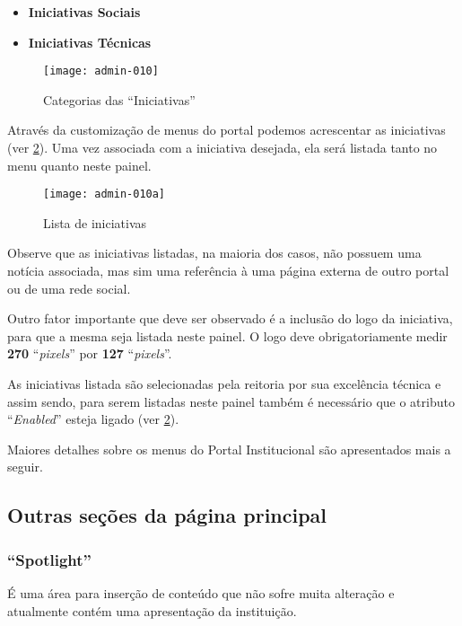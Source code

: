 \begin{itemize}
    \item \textbf{Iniciativas Sociais}
    \item \textbf{Iniciativas Técnicas}
\end{itemize}

\begin{figure}[!ht]
    \centering
    \texttt{[image: admin-010]}
    \caption{Categorias das ``Iniciativas''}\label{RS0006:fig:admin-010}
\end{figure}

Através da customização de menus do portal podemos acrescentar as iniciativas (ver \cref{RS0006:fig:admin-010a}). Uma vez associada com a iniciativa desejada, ela será listada tanto no menu quanto neste painel.

\begin{figure}[!ht]
    \centering
    \texttt{[image: admin-010a]}
    \caption{Lista de iniciativas}\label{RS0006:fig:admin-010a}
\end{figure}

Observe que as iniciativas listadas, na maioria dos casos, não possuem uma notícia associada, mas sim uma referência à uma página externa de outro portal ou de uma rede social.

Outro fator importante que deve ser observado é a inclusão do logo da iniciativa, para que a mesma seja listada neste painel. O logo deve obrigatoriamente medir \textbf{270} ``\textit{pixels}'' por \textbf{127} ``\textit{pixels}''.

As iniciativas listada são selecionadas pela reitoria por sua excelência técnica e assim sendo, para serem listadas neste painel também é necessário que o atributo ``\textit{Enabled}'' esteja ligado (ver \cref{RS0006:fig:admin-010a}).

Maiores detalhes sobre os menus do Portal Institucional são apresentados mais a seguir.

\subsection{Outras seções da página principal}

\subsubsection{``Spotlight''}

É uma área para inserção de conteúdo que não sofre muita alteração e atualmente contém uma apresentação da instituição.

